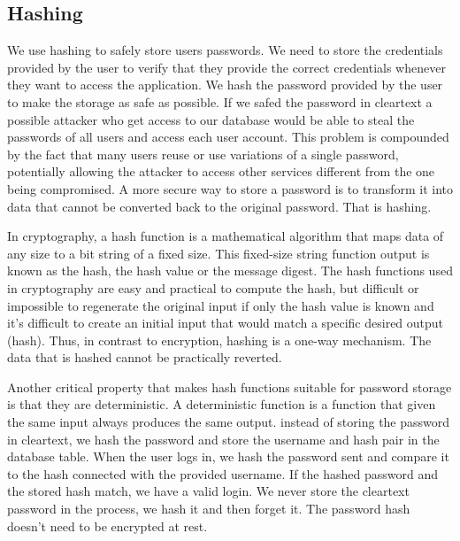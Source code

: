 \documentclass[]{article}
\begin{document}
\subsection{Hashing} \label{hash}
We use hashing to safely store users passwords. We need to store the credentials provided by the user
to verify that they provide the correct credentials whenever they want to access the application. We hash
the password provided by the user to make the storage as safe as possible. If we safed the password in cleartext 
a possible attacker who get access to our database would be able to steal the passwords of all users and access
each user account. This problem is compounded by the fact that many users reuse or use variations of a single 
password, potentially allowing the attacker to access other services different from the one being compromised.
A more secure way to store a password is to transform it into data that cannot be converted back to the original 
password. That is hashing.

In cryptography, a hash function is a mathematical algorithm that maps data 
of any size to a bit string of a fixed size. This fixed-size string function output is known as the 
hash, the hash value or the message digest. The hash functions used in cryptography are easy and 
practical to compute the hash, but difficult or impossible to regenerate the original input if only the hash 
value is known and it's difficult to create an initial input that would match a specific desired output (hash).
Thus, in contrast to encryption, hashing is a one-way mechanism. The data that is hashed cannot be practically 
reverted.

Another critical property that makes hash functions suitable for password storage is that they are deterministic.
A deterministic function is a function that given the same input always produces the same output. instead of storing 
the password in cleartext, we hash the password and store the username and hash pair in the database table. When 
the user logs in, we hash the password sent and compare it to the hash connected with the provided username. If the 
hashed password and the stored hash match, we have a valid login. We never store the 
cleartext password in the process, we hash it and then forget it. The password hash doesn't need to be encrypted at 
rest. 
\end{document}
